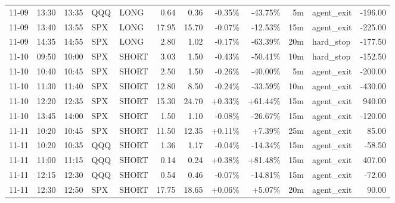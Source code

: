 \documentclass[11pt,a4paper]{article}
\begin{document}
\begin{center}
\begin{longtable}{>{\color{txtmain}}l l l l l r r r r r >{\color{txtmain}}l r}
11-09 & 13:30 & 13:35 & QQQ & LONG & 0.64 & 0.36 & \textcolor{lossred}{-0.35\%} & \textcolor{lossred}{-43.75\%} & 5m & agent\_exit & \textcolor{lossred}{-196.00} \\
11-09 & 13:40 & 13:55 & SPX & LONG & 17.95 & 15.70 & \textcolor{lossred}{-0.07\%} & \textcolor{lossred}{-12.53\%} & 15m & agent\_exit & \textcolor{lossred}{-225.00} \\
11-09 & 14:35 & 14:55 & SPX & LONG & 2.80 & 1.02 & \textcolor{lossred}{-0.17\%} & \textcolor{lossred}{-63.39\%} & 20m & hard\_stop & \textcolor{lossred}{-177.50} \\
11-10 & 09:50 & 10:00 & SPX & SHORT & 3.03 & 1.50 & \textcolor{lossred}{-0.43\%} & \textcolor{lossred}{-50.41\%} & 10m & hard\_stop & \textcolor{lossred}{-152.50} \\
11-10 & 10:40 & 10:45 & SPX & SHORT & 2.50 & 1.50 & \textcolor{lossred}{-0.26\%} & \textcolor{lossred}{-40.00\%} & 5m & agent\_exit & \textcolor{lossred}{-200.00} \\
11-10 & 11:30 & 11:40 & SPX & SHORT & 12.80 & 8.50 & \textcolor{lossred}{-0.24\%} & \textcolor{lossred}{-33.59\%} & 10m & agent\_exit & \textcolor{lossred}{-430.00} \\
11-10 & 12:20 & 12:35 & SPX & SHORT & 15.30 & 24.70 & \textcolor{wingreen}{+0.33\%} & \textcolor{wingreen}{+61.44\%} & 15m & agent\_exit & \textcolor{wingreen}{940.00} \\
11-10 & 13:45 & 14:00 & SPX & SHORT & 1.50 & 1.10 & \textcolor{lossred}{-0.08\%} & \textcolor{lossred}{-26.67\%} & 15m & agent\_exit & \textcolor{lossred}{-120.00} \\
11-11 & 10:20 & 10:45 & SPX & SHORT & 11.50 & 12.35 & \textcolor{wingreen}{+0.11\%} & \textcolor{wingreen}{+7.39\%} & 25m & agent\_exit & \textcolor{wingreen}{85.00} \\
11-11 & 10:20 & 10:35 & QQQ & SHORT & 1.36 & 1.17 & \textcolor{lossred}{-0.04\%} & \textcolor{lossred}{-14.34\%} & 15m & agent\_exit & \textcolor{lossred}{-58.50} \\
11-11 & 11:00 & 11:15 & QQQ & SHORT & 0.14 & 0.24 & \textcolor{wingreen}{+0.38\%} & \textcolor{wingreen}{+81.48\%} & 15m & agent\_exit & \textcolor{wingreen}{407.00} \\
11-11 & 12:15 & 12:30 & QQQ & SHORT & 0.54 & 0.46 & \textcolor{lossred}{-0.07\%} & \textcolor{lossred}{-14.81\%} & 15m & agent\_exit & \textcolor{lossred}{-72.00} \\
11-11 & 12:30 & 12:50 & SPX & SHORT & 17.75 & 18.65 & \textcolor{wingreen}{+0.06\%} & \textcolor{wingreen}{+5.07\%} & 20m & agent\_exit & \textcolor{wingreen}{90.00} \\

\end{longtable}
\end{center}
\end{document}
